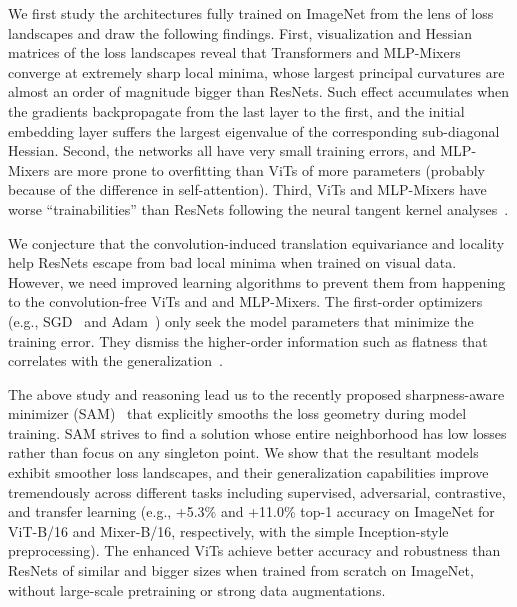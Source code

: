 \documentclass{article}
\newcommand{\XC}[1]{\textcolor{red}{Xiangning: #1}}
\begin{document}
We first study the architectures fully trained on ImageNet from the lens of loss landscapes and draw the following findings. First, visualization and Hessian matrices of the loss landscapes reveal that Transformers and MLP-Mixers converge at extremely sharp local minima, whose largest principal curvatures are almost an order of magnitude bigger than ResNets.
Such effect accumulates when the gradients backpropagate from the last layer to the first, and the initial embedding layer suffers the largest eigenvalue of the corresponding sub-diagonal Hessian.  
Second, the networks all have very small training errors, and MLP-Mixers are more prone to overfitting than ViTs of more parameters (probably because of the difference in self-attention). 
Third, ViTs and MLP-Mixers have worse ``trainabilities'' than ResNets following the neural tangent kernel analyses~\cite{pmlr-v119-xiao20b}. 



We conjecture that the convolution-induced translation equivariance and locality help ResNets escape from bad local minima when trained on visual data. However, we need improved learning algorithms to prevent them from happening to the convolution-free ViTs and and MLP-Mixers. The first-order optimizers (e.g., SGD~\cite{Nesterov1983AMF} and Adam~\cite{kingma2017adam}) only seek the model parameters that minimize the training error. 
They dismiss the higher-order information such as flatness that correlates with the generalization~\cite{keskar2017largebatch, pmlr-v80-kleinberg18a, jastrzebski2018on, l.2018a, chaudhari2017entropysgd}.

The above study and reasoning lead us to the recently proposed sharpness-aware minimizer (SAM)~\cite{foret2021sharpnessaware} that explicitly smooths the loss geometry during model training. SAM strives to find a solution whose entire neighborhood has low losses rather than focus on any singleton point. We show that the resultant models exhibit smoother loss landscapes, and their generalization capabilities improve tremendously across different tasks including supervised, adversarial, contrastive, and transfer learning (e.g., +5.3\% and +11.0\% top-1 accuracy on ImageNet for ViT-B/16 and Mixer-B/16, respectively, with the simple Inception-style preprocessing). The enhanced ViTs achieve better accuracy and robustness than ResNets of similar and bigger sizes when trained from scratch on ImageNet, without large-scale pretraining or strong data augmentations.
\end{document}
